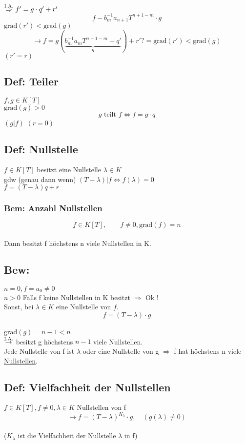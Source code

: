 \documentclass[titlepage,12pt,a4paper,ngerman]{report}
\newcommand{\tx}[1]{\textrm{#1}}
\newcommand{\grad}{\tx{grad}}
\begin{document}
$\buildrel \tx{I.A.}\over \Rightarrow f' = g \cdot  q' + r'$
$$ f - b_{m}^{-1} a_{n+1} T^{n+1-m} \cdot g$$
$\grad(r') < \grad(g)$
$$\rightarrow f = g(\underbrace{b_{m}^{-1} a_{m} T^{n+1-m} + q'}_{q}) + r' ?= \grad(r') < \grad(g)$$
$( r' = r)$

\subsection{Def: Teiler} 
$f,g \in K[T]$\\
$ \grad (g)> 0$
$$g \textrm{ teilt } f \Leftrightarrow f = g\cdot q$$
$(g|f)$ $(r=0)$\\
\subsection{Def: Nullstelle} $f \in K[T]$ besitzt eine Nullstelle $\lambda \in K$\\
gdw (genau dann wenn) $(T-\lambda) | f \Leftrightarrow f(\lambda) = 0$ \\
$f = (T-\lambda) q + r$\\
\subsubsection{Bem: Anzahl Nullstellen} $$f\in K[T] , \qquad f\neq 0 , \grad(f) = n$$\\
Dann besitzt f höchstens n viele Nullstellen in K.\\
\subsection{Bew:} $n= 0,  f = a_{0} \neq 0$\\
$n> 0 $ Falls f keine Nullstellen in K besitzt $\Rightarrow$ Ok !\\
Sonst, bei $\lambda\in K $ eine Nullstelle von $f$. \\
$$f = (T-\lambda) \cdot g$$\\
$ \grad (g) = n-1< n$\\
$\buildrel \tx{I.A.}\over \rightarrow$ besitzt g höchstens $n-1$ viele Nullstellen.\\
Jede Nullstelle von f ist $\lambda$ oder eine Nullstelle von g $\Rightarrow$ f hat höchstens n viele \underline{Nullstellen}.\\
\subsection{Def: Vielfachheit der Nullstellen} $f\in K[T], f \neq 0 , \lambda \in K$ Nullstellen von f\\
$$\rightarrow f = (T-\lambda)^{K_{\lambda }} \cdot g, \quad (g(\lambda) \neq 0)$$\\
($K_{\lambda}$ ist die Vielfachheit der Nullstelle $\lambda$ in f)\\
\end{document}
